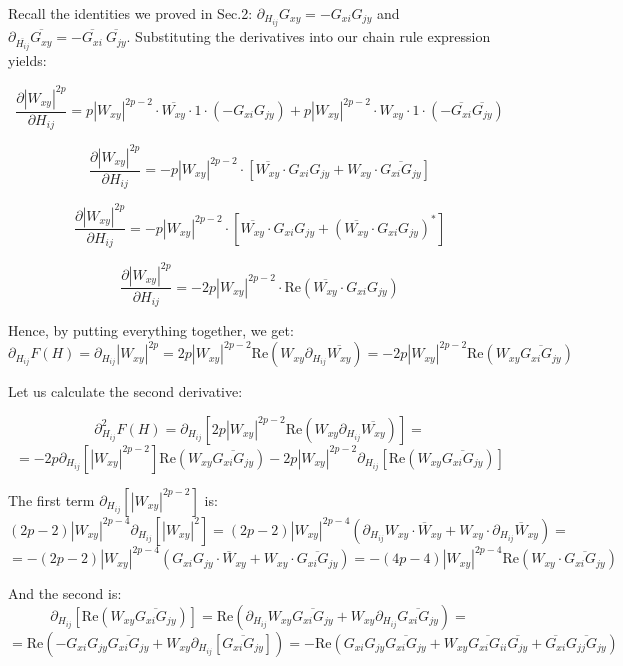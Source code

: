 \documentclass[11pt]{article}
\begin{document}
\noindent Recall the identities we proved in Sec.2: $\partial_{H_{ij}}G_{xy} = -G_{xi}G_{jy}$ and $\partial_{\overline{H_{ij}}}\overline{G_{xy}} = -\overline{G_{xi}}\ \overline{G_{jy}}$. Substituting the derivatives into our chain rule expression yields:

$$\frac{\partial |W_{xy}|^{2p}}{\partial H_{ij}} = p|W_{xy}|^{2p-2} \cdot \overline{W_{xy}} \cdot 1 \cdot (-G_{xi}G_{jy}) + p|W_{xy}|^{2p-2} \cdot W_{xy} \cdot 1 \cdot (-\overline{G_{xi}}\overline{G_{jy}})$$

$$\frac{\partial |W_{xy}|^{2p}}{\partial H_{ij}} = -p|W_{xy}|^{2p-2} \cdot [\overline{W_{xy}} \cdot G_{xi}G_{jy} + W_{xy} \cdot \overline{G_{xi}G_{jy}}]$$

$$\frac{\partial |W_{xy}|^{2p}}{\partial H_{ij}} = -p|W_{xy}|^{2p-2} \cdot [\overline{W_{xy}} \cdot G_{xi}G_{jy} + (\overline{W_{xy}} \cdot G_{xi}G_{jy})^*]$$

$$\frac{\partial |W_{xy}|^{2p}}{\partial H_{ij}} = -2p|W_{xy}|^{2p-2} \cdot \text{Re}(\overline{W_{xy}} \cdot G_{xi}G_{jy})$$

\noindent Hence, by putting everything together, we get: $$\partial_{H_{ij}}F(H) = \partial_{H_{ij}} |W_{xy}|^{2p} = 2p|W_{xy}|^{2p-2}\text{Re}\left(W_{xy}\partial_{H_{ij}}\overline{W_{xy}}\right)= -2p|W_{xy}|^{2p-2}\text{Re}\left(W_{xy}\overline{G_{xi}G_{jy}}\right)$$

\noindent Let us calculate the second derivative:

$$\partial_{H_{ij}}^2F(H) = \partial_{H_{ij}}\left[ 2p|W_{xy}|^{2p-2}\text{Re}\left(W_{xy}\partial_{H_{ij}}\overline{W_{xy}}\right)\right]=$$ $$= -2p \partial_{H_{ij}}\left[|W_{xy}|^{2p-2}\right]\text{Re}\left(W_{xy}\overline{G_{xi}G_{jy}}\right)-2p|W_{xy}|^{2p-2}\partial_{H_{ij}} \left[\text{Re}\left(W_{xy}\overline{G_{xi}G_{jy}}\right)\right]$$

\noindent The first term $\partial_{H_{ij}}\left[|W_{xy}|^{2p-2}\right] $ is: $$ (2p-2)|W_{xy}|^{2p-4}\partial_{H_{ij}}\left[|W_{xy}|^2\right] = (2p-2)|W_{xy}|^{2p-4}\left(\partial_{H_{ij}} W_{xy}\cdot \overline{W}_{xy}+W_{xy}\cdot \partial_{H_{ij}} \overline{W}_{xy}\right)=$$ $$= -(2p-2)|W_{xy}|^{2p-4}\left(G_{xi}G_{jy}\cdot \overline{W}_{xy}+W_{xy}\cdot \overline{G_{xi}G_{jy}}\right) = -(4p-4)|W_{xy}|^{2p-4} \text{Re}\left(W_{xy}\cdot \overline{G_{xi}G_{jy}}\right)$$

\noindent And the second is: $$\partial_{H_{ij}}\left[\text{Re}\left(W_{xy}\overline{G_{xi}G_{jy}}\right)\right] = \text{Re}\left(\partial_{H_{ij}} W_{xy} \overline{G_{xi}G_{jy}}+W_{xy} \partial_{H_{ij}} \overline{G_{xi}G_{jy}}\right)=$$ $$=\text{Re}\left(-G_{xi}G_{jy}\overline{G_{xi}G_{jy}}+W_{xy}\partial_{H_{ij}}\left[\overline{G_{xi}G_{jy}}\right]\right) =-\text{Re}\left(G_{xi}G_{jy}\overline{G_{xi}G_{jy}}+W_{xy}\overline{G_{xi}G_{ii}}\overline{G_{jy}}+\overline{G_{xi}}\overline{G_{jj}G_{jy}}\right) $$
\end{document}

